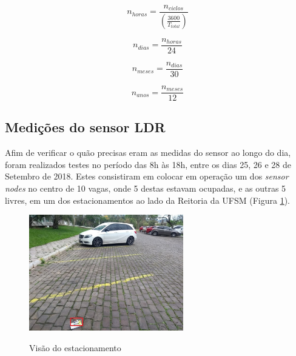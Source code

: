 \documentclass[oneside,openright,12pt]{ufsm_2015} %
\begin{document}
    \begin{equation}
        n_{horas} = \frac{n_{ciclos}}{(\frac{3600}{T_{total}})}
        \label{eq:n_horas}
    \end{equation}
    
    \begin{equation}
        n_{dias} = \frac{n_{horas}}{24}
        \label{eq:n_dias}
    \end{equation}

    \begin{equation}
        n_{meses} = \frac{n_{dias}}{30}
        \label{eq:n_meses}
    \end{equation}
    
    \begin{equation}
        n_{anos} = \frac{n_{meses}}{12}
        \label{eq:n_anos}
    \end{equation}

    \subsection{Medições do sensor LDR}
    Afim de verificar o quão precisas eram as medidas do sensor ao longo do dia, foram realizados testes no período das 8h às 18h, entre os dias 25, 26 e 28 de Setembro de 2018. Estes consistiram em colocar em operação um dos \textit{sensor nodes} no centro de 10 vagas, onde 5 destas estavam ocupadas, e as outras 5 livres, em um dos estacionamentos ao lado da Reitoria da UFSM (Figura \ref{fig:estac-visao}).
    
    \begin{figure}[ht]
     	    \caption{\label{exepretex} Visão do estacionamento}
            \centering
            \includegraphics[width=0.6\textwidth]{figuras/estacionamento_visao.jpg}
            \vspace{\baselineskip} %
            \label{fig:estac-visao}
    \end{figure}
    
\end{document}
